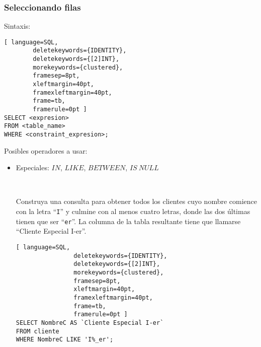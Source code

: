 \begin{frame}[fragile]
	
	\frametitle{Seleccionando filas}
	
	Sintaxis:
	\begin{lstlisting}[ language=SQL,
		deletekeywords={IDENTITY},
		deletekeywords={[2]INT},
		morekeywords={clustered},
		framesep=8pt,
		xleftmargin=40pt,
		framexleftmargin=40pt,
		frame=tb,
		framerule=0pt ]
SELECT <expresion>
FROM <table_name>
WHERE <constraint_expresion>;
\end{lstlisting} 
	
	Posibles operadores a usar: 
	\begin{itemize}
		
		\item Especiales: $IN$, $LIKE$, $BETWEEN$, $IS\ NULL$
		
		\pause 
		
		\ 
		
		Construya una consulta para obtener todos los clientes cuyo nombre comience con la letra ``\texttt{I}'' y culmine con al menos cuatro letras, donde las dos últimas tienen que ser ``\texttt{er}''. La columna de la tabla resultante tiene que llamarse ``Cliente Especial I-er''.
		
		\pause
		
			\begin{lstlisting}[ language=SQL,
				deletekeywords={IDENTITY},
				deletekeywords={[2]INT},
				morekeywords={clustered},
				framesep=8pt,
				xleftmargin=40pt,
				framexleftmargin=40pt,
				frame=tb,
				framerule=0pt ]
SELECT NombreC AS `Cliente Especial I-er`
FROM cliente 
WHERE NombreC LIKE 'I%_er';
\end{lstlisting}
			
	\end{itemize}
	
\end{frame}


